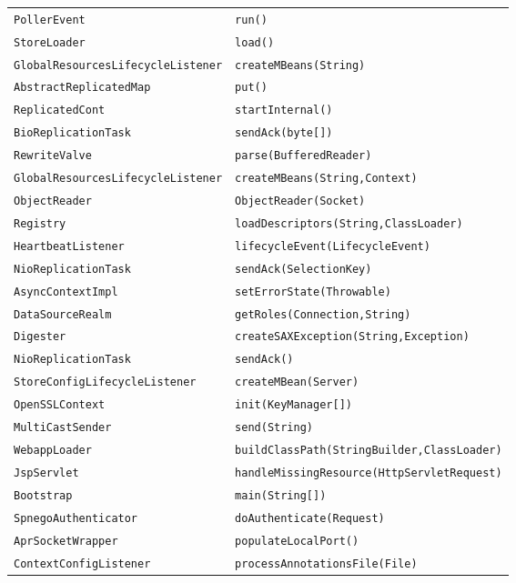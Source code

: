 \begin{center}
\begin{longtable}{ll}
\lstinline/PollerEvent/&{\lstinline/run()/}\\
\lstinline/StoreLoader/&{\lstinline/load()/}\\
\lstinline/GlobalResourcesLifecycleListener/&{\lstinline/createMBeans(String)/}\\
\lstinline/AbstractReplicatedMap/&{\lstinline/put()/}\\
\lstinline/ReplicatedCont/&{\lstinline/startInternal()/}\\
\lstinline/BioReplicationTask/&{\lstinline/sendAck(byte[])/}\\
\lstinline/RewriteValve/&{\lstinline/parse(BufferedReader)/}\\
\lstinline/GlobalResourcesLifecycleListener/&{\lstinline/createMBeans(String,Context)/}\\
\lstinline/ObjectReader/&{\lstinline/ObjectReader(Socket)/}\\
\lstinline/Registry/&{\lstinline/loadDescriptors(String,ClassLoader)/}\\
\lstinline/HeartbeatListener/&{\lstinline/lifecycleEvent(LifecycleEvent)/}\\
\lstinline/NioReplicationTask/&{\lstinline/sendAck(SelectionKey)/}\\
\lstinline/AsyncContextImpl/&{\lstinline/setErrorState(Throwable)/}\\
\lstinline/DataSourceRealm/&{\lstinline/getRoles(Connection,String)/}\\
\lstinline/Digester/&{\lstinline/createSAXException(String,Exception)/}\\
\lstinline/NioReplicationTask/&{\lstinline/sendAck()/}\\
\lstinline/StoreConfigLifecycleListener/&{\lstinline/createMBean(Server)/}\\
\lstinline/OpenSSLContext/&{\lstinline/init(KeyManager[])/}\\
\lstinline/MultiCastSender/&{\lstinline/send(String)/}\\
\lstinline/WebappLoader/&{\lstinline/buildClassPath(StringBuilder,ClassLoader)/}\\
\lstinline/JspServlet/&{\lstinline/handleMissingResource(HttpServletRequest)/}\\
\lstinline/Bootstrap/&{\lstinline/main(String[])/}\\
\lstinline/SpnegoAuthenticator/&{\lstinline/doAuthenticate(Request)/}\\
\lstinline/AprSocketWrapper/&{\lstinline/populateLocalPort()/}\\
\lstinline/ContextConfigListener/&{\lstinline/processAnnotationsFile(File)/}\\

\end{longtable}
\end{center}
